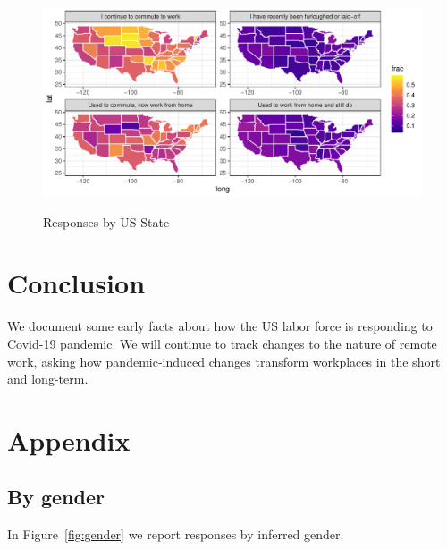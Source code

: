 \documentclass[12pt]{article}
\begin{document}
\begin{figure}
  \caption{Responses by US State} \label{fig:geo}
\centering
\begin{minipage}{1.0 \linewidth}
  \includegraphics[width = \linewidth]{plots/geo.pdf} \\
  \begin{footnotesize}
    \end{footnotesize}
\end{minipage}
\end{figure} 

\section{Conclusion}
We document some early facts about how the US labor force is responding to Covid-19 pandemic.
We will continue to track changes to the nature of remote work, asking how pandemic-induced changes transform workplaces in the short and long-term.
  
\newpage \clearpage




\appendix

\section{Appendix} 
\subsection{By gender} \label{sec:gender}

In Figure~\ref{fig:gender} we report responses by inferred gender.
\end{document}
